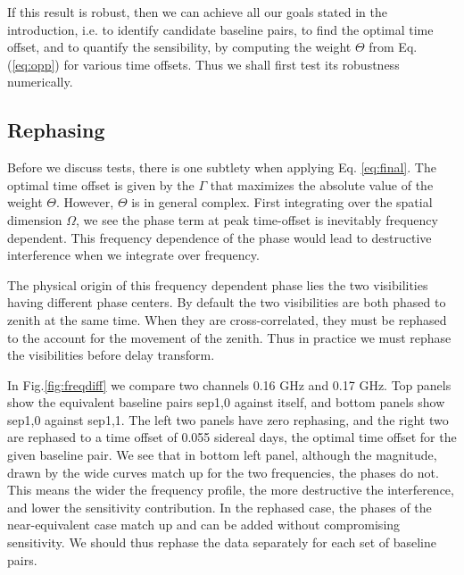 \documentclass[preprint2,numberedappendix,tighten,twocolappendix]{aastex6}  %
\renewcommand\[{\begin{equation}}
\renewcommand\]{\end{equation}}
\begin{document}
If this result is robust, then we can achieve all our goals stated in the introduction, i.e. to identify 
candidate baseline pairs, to find the optimal time offset, and to quantify the sensibility, by computing the weight $\Theta$ from
Eq.(\ref{eq:opp}) for various time offsets. Thus we shall first test its robustness numerically.

\subsection{Rephasing \label{sec:rephs}}
Before we discuss tests, there is one subtlety when applying Eq. \ref{eq:final}. The optimal time offset is given by the $\Gamma$ that maximizes the absolute value of the weight $\Theta$. However, $\Theta$ is in general complex. First integrating over the spatial dimension $\Omega$, we see the phase term at peak time-offset is inevitably frequency dependent. This frequency dependence of the phase would lead to destructive interference when we integrate over frequency.

The physical origin of this frequency dependent phase lies the two visibilities having different phase centers. By default the two visibilities are both phased to zenith at the same time. When they are cross-correlated, they must be rephased to the account for the movement of the zenith. Thus in practice we must rephase the visibilities before delay transform. 


In Fig.\ref{fig:freqdiff} we compare two channels 0.16 GHz and 0.17 GHz.  Top panels show the equivalent baseline pairs sep1,0 against itself, and bottom panels show sep1,0 against sep1,1. The left two panels have zero rephasing, and the right two are rephased to a time offset of 0.055 sidereal days, the optimal time offset for the given baseline pair. We see that in bottom left panel, although the magnitude, drawn by the wide curves match up for the two frequencies, the phases do not. This means the wider the frequency profile, the more destructive the interference, and lower the sensitivity contribution. In the rephased case, the phases of the near-equivalent case match up and can be added without compromising sensitivity. We should thus rephase the data separately for each set of baseline pairs. 
\end{document}

